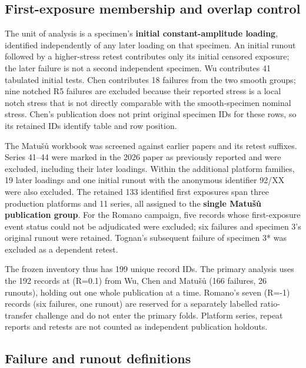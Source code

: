 \documentclass[12pt,a4paper]{article}
\begin{document}
\subsection{First-exposure membership and overlap control}

The unit of analysis is a specimen’s \textbf{initial constant-amplitude loading}, identified independently of any later loading on that specimen. An initial runout followed by a higher-stress retest contributes only its initial censored exposure; the later failure is not a second independent specimen. Wu contributes 41 tabulated initial tests. Chen contributes 18 failures from the two smooth groups; nine notched R5 failures are excluded because their reported stress is a local notch stress that is not directly comparable with the smooth-specimen nominal stress. Chen’s publication does not print original specimen IDs for these rows, so its retained IDs identify table and row position.

The Matušů workbook was screened against earlier papers and its retest suffixes. Series 41–44 were marked in the 2026 paper as previously reported and were excluded, including their later loadings. Within the additional platform families, 19 later loadings and one initial runout with the anonymous identifier 92/XX were also excluded. The retained 133 identified first exposures span three production platforms and 11 series, all assigned to the \textbf{single Matušů publication group}. For the Romano campaign, five records whose first-exposure event status could not be adjudicated were excluded; six failures and specimen 3’s original runout were retained. Tognan’s subsequent failure of specimen 3* was excluded as a dependent retest.

The frozen inventory thus has 199 unique record IDs. The primary analysis uses the 192 records at (R=0.1) from Wu, Chen and Matušů (166 failures, 26 runouts), holding out one whole publication at a time. Romano’s seven (R=-1) records (six failures, one runout) are reserved for a separately labelled ratio-transfer challenge and do not enter the primary folds. Platform series, repeat reports and retests are not counted as independent publication holdouts.

\subsection{Failure and runout definitions}
\end{document}
